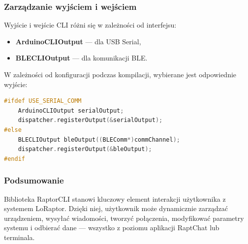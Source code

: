 \clearpage
\subsubsection{Zarządzanie wyjściem i wejściem}

Wyjście i wejście CLI różni się w zależności od interfejsu:
\begin{itemize}
	\item \textbf{ArduinoCLIOutput} — dla USB Serial,
	\item \textbf{BLECLIOutput} — dla komunikacji BLE.
\end{itemize}
W zależności od konfiguracji podczas kompilacji, wybierane jest odpowiednie wyjście:
\begin{lstlisting}[language=C++]
#ifdef USE_SERIAL_COMM
	ArduinoCLIOutput serialOutput;
	dispatcher.registerOutput(&serialOutput);
#else
	BLECLIOutput bleOutput((BLEComm*)commChannel);
	dispatcher.registerOutput(&bleOutput);
#endif
\end{lstlisting}

\subsubsection{Podsumowanie}

Biblioteka RaptorCLI stanowi kluczowy element interakcji użytkownika z systemem LoRaptor. Dzięki niej, użytkownik może dynamicznie zarządzać urządzeniem, wysyłać wiadomości, tworzyć połączenia, modyfikować parametry systemu i odbierać dane --- wszystko z poziomu aplikacji RaptChat lub terminala.
